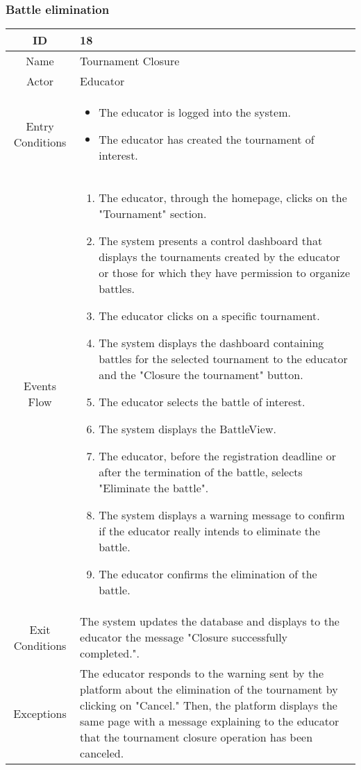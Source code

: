 \subsubsection{Battle elimination}
\begin{longtable}{|c| p{10cm}|}
        \hline
            ID & 18 \\
        \hline
            Name & Tournament Closure \\
        \hline
            Actor & Educator\\
        \hline
            Entry Conditions &
            \begin{itemize}
                \item The educator is logged into the system.
                \item The educator has created the tournament of interest.
            \end{itemize}\\
        \hline
            Events Flow &   \begin{enumerate}
                            \item The educator, through the homepage, clicks on the "Tournament" section.
                            \item The system presents a control dashboard that displays the tournaments created by the educator or those for which they have permission to organize battles.
                            \item The educator clicks on a specific tournament.
                            \item The system displays the dashboard containing battles for the selected tournament to the educator and the "Closure the tournament" button.
                            \item The educator selects the battle of interest.
                            \item The system displays the BattleView.
                            \item The educator, before the registration deadline or after the termination of the battle, selects "Eliminate the battle".
                            \item The system displays a warning message to confirm if the educator really intends to eliminate the battle.
                            \item The educator confirms the elimination of the battle.
                            \end{enumerate} \\
                            \hline
            Exit Conditions &
            The system updates the database and displays to the educator the message "Closure successfully completed.".
            \\
        \hline
         Exceptions &
             The educator responds to the warning sent by the platform about the elimination of the tournament by clicking on "Cancel." Then, the platform displays the same page with a message explaining to the educator that the tournament closure operation has been canceled.
        \\
             \hline
         

\end{longtable}
